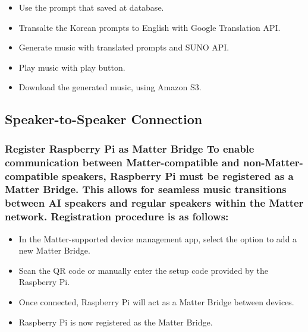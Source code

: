 \documentclass[conference]{IEEEtran}
\begin{document}
\begin{itemize}
    \item Use the prompt that saved at database.\\
    \item Transalte the Korean prompts to English with Google Translation API.\\
    \item Generate music with translated prompts and SUNO API.\\
    \item Play music with play button.\\
    \item Download the generated music, using Amazon S3.\\
\end{itemize}


\subsection{Speaker-to-Speaker Connection}

\subsubsection{Register Raspberry Pi as Matter Bridge To enable communication between Matter-compatible and non-Matter-compatible speakers, Raspberry Pi must be registered as a Matter Bridge. This allows for seamless music transitions between AI speakers and regular speakers within the Matter network. Registration procedure is as follows:}
\begin{itemize}
    \item In the Matter-supported device management app, select the option to add a new Matter Bridge.\\
    \item Scan the QR code or manually enter the setup code provided by the Raspberry Pi.\\
    \item Once connected, Raspberry Pi will act as a Matter Bridge between devices.\\
    \item Raspberry Pi is now registered as the Matter Bridge.\\
\end{itemize}
\end{document}
